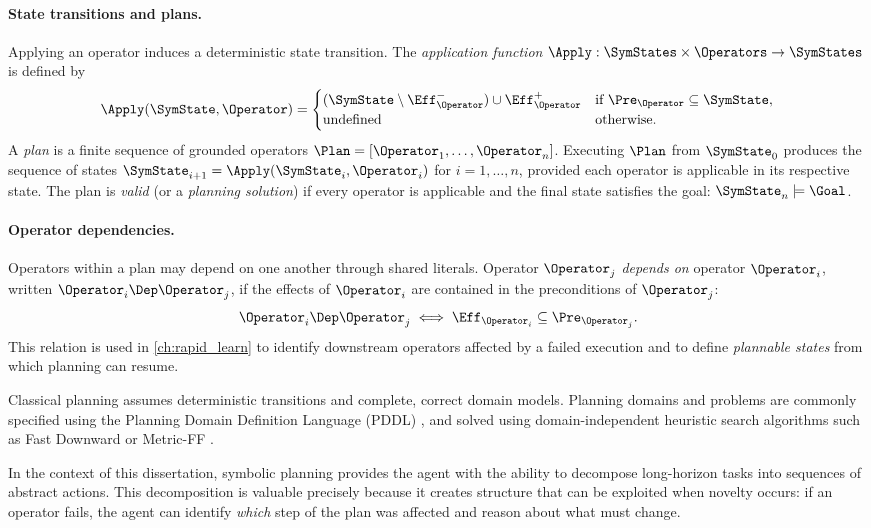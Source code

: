 \paragraph{State transitions and plans.}
Applying an operator induces a deterministic state transition. The \emph{application function} $\Apply : \SymStates \times \Operators \rightarrow \SymStates$ is defined by
\[
\Apply(\SymState, \Operator) =
\begin{cases}
(\SymState \setminus \Eff_\Operator^-) \cup \Eff_\Operator^+ & \text{if } \Pre_\Operator \subseteq \SymState, \\
\text{undefined} & \text{otherwise}.
\end{cases}
\]
A \emph{plan} is a finite sequence of grounded operators $\Plan = [\Operator_1, \dots, \Operator_n]$. Executing $\Plan$ from $\SymState_0$ produces the sequence of states $\SymState_{i+1} = \Apply(\SymState_i, \Operator_i)$ for $i = 1, \ldots, n$, provided each operator is applicable in its respective state. The plan is \emph{valid} (or a \emph{planning solution}) if every operator is applicable and the final state satisfies the goal: $\SymState_n \models \Goal$.

\paragraph{Operator dependencies.}
Operators within a plan may depend on one another through shared literals. Operator $\Operator_j$ \emph{depends on} operator $\Operator_i$, written $\Operator_i \Dep \Operator_j$, if the effects of $\Operator_i$ are contained in the preconditions of $\Operator_j$:
\[
\Operator_i \Dep \Operator_j \iff \Eff_{\Operator_i} \subseteq \Pre_{\Operator_j}.
\]
This relation is used in \cref{ch:rapid_learn} to identify downstream operators affected by a failed execution and to define \emph{plannable states} from which planning can resume.

Classical planning assumes deterministic transitions and complete, correct domain models. Planning domains and problems are commonly specified using the Planning Domain Definition Language (PDDL) \citep{mcdermott1998pddl}, and solved using domain-independent heuristic search algorithms such as Fast Downward \citep{helmert2006fast} or Metric-FF \citep{ecai02}.

In the context of this dissertation, symbolic planning provides the agent with the ability to decompose long-horizon tasks into sequences of abstract actions. This decomposition is valuable precisely because it creates structure that can be exploited when novelty occurs: if an operator fails, the agent can identify \emph{which} step of the plan was affected and reason about what must change.

